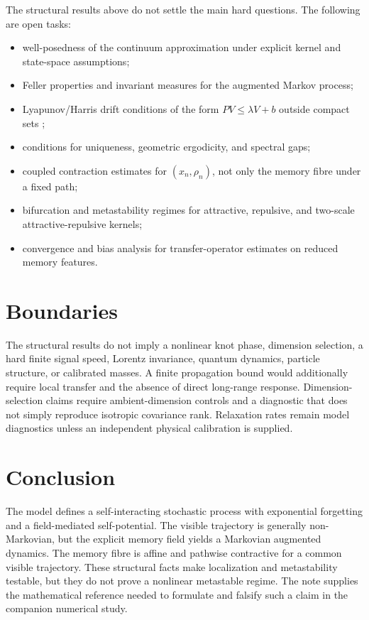\documentclass[preprint,amsmath,amssymb,aps,prd,nofootinbib,floatfix]{revtex4-2}
\begin{document}
The structural results above do not settle the main hard questions. The
following are open tasks:
\begin{itemize}
\item well-posedness of the continuum approximation under explicit kernel and
state-space assumptions;
\item Feller properties and invariant measures for the augmented Markov
process;
\item Lyapunov/Harris drift conditions of the form
$PV\leq\lambda V+b$ outside compact sets \cite{MeynTweedie2009};
\item conditions for uniqueness, geometric ergodicity, and spectral gaps;
\item coupled contraction estimates for $(x_n,\rho_n)$, not only the memory
fibre under a fixed path;
\item bifurcation and metastability regimes for attractive, repulsive, and
two-scale attractive-repulsive kernels;
\item convergence and bias analysis for transfer-operator estimates on
reduced memory features.
\end{itemize}

\section{Boundaries}

The structural results do not imply a nonlinear knot phase, dimension
selection, a hard finite signal speed, Lorentz invariance, quantum dynamics,
particle structure, or calibrated masses.
A finite propagation bound would additionally require local transfer and the
absence of direct long-range response.
Dimension-selection claims require ambient-dimension controls and a diagnostic
that does not simply reproduce isotropic covariance rank.
Relaxation rates remain model diagnostics unless an independent physical
calibration is supplied.
\section{Conclusion}

The model defines a self-interacting stochastic process with exponential
forgetting and a field-mediated self-potential. The visible trajectory is
generally non-Markovian, but the explicit memory field yields a Markovian
augmented dynamics. The memory fibre is affine and pathwise contractive for a
common visible trajectory. These structural facts make localization and
metastability testable, but they do not prove a nonlinear metastable regime.
The note supplies the mathematical reference needed to formulate and falsify
such a claim in the companion numerical study.



\end{document}
